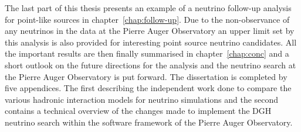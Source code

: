 The last part of this thesis presents an example of a neutrino follow-up analysis for point-like sources in chapter~\ref{chap:follow-up}. Due to the non-observance of any neutrinos in the data at the Pierre Auger Observatory an upper limit set by this analysis is also provided for interesting point source neutrino candidates. All the important results are then finally summarised in chapter~\ref{chap:conc} and a short outlook on the future directions for the analysis and the neutrino search at the Pierre Auger Observatory is put forward. The dissertation is completed by five appendices. The first describing the independent work done to compare the various hadronic interaction models for neutrino simulations and the second contains a technical overview of the changes made to implement the \gls{DGH} neutrino search within the software framework of the Pierre Auger Observatory. 


